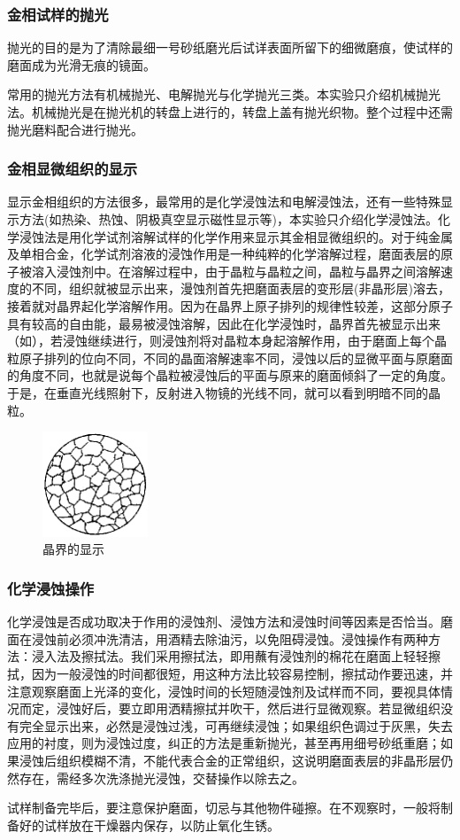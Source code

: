 \documentclass[a4paper,utf8]{article}
\begin{document}
        \subsubsection{金相试样的抛光}
        抛光的目的是为了清除最细一号砂纸磨光后试详表面所留下的细微磨痕，使试样的磨面成为光滑无痕的镜面。\par
        常用的抛光方法有机械抛光、电解抛光与化学抛光三类。本实验只介绍机械抛光法。机械抛光是在抛光机的转盘上进行的，转盘上盖有抛光织物。整个过程中还需抛光磨料配合进行抛光。
        \subsubsection{金相显微组织的显示}
        显示金相组织的方法很多，最常用的是化学浸蚀法和电解浸蚀法，还有一些特殊显示方法(如热染、热蚀、阴极真空显示磁性显示等)，本实验只介绍化学浸蚀法。化学浸蚀法是用化学试剂溶解试样的化学作用来显示其金相显微组织的。对于纯金属及单相合金，化学试剂溶液的浸蚀作用是一种纯粹的化学溶解过程，磨面表层的原子被溶入浸蚀剂中。在溶解过程中，由于晶粒与晶粒之间，晶粒与晶界之间溶解速度的不同，组织就被显示出来，漫蚀剂首先把磨面表层的变形层(非晶形层)溶去，接着就对晶界起化学溶解作用。因为在晶界上原子排列的规律性较差，这部分原子具有较高的自由能，最易被浸蚀溶解，因此在化学浸蚀时，晶界首先被显示出来（如），若浸蚀继续进行，则浸蚀剂将对晶粒本身起溶解作用，由于磨面上每个晶粒原子排列的位向不同，不同的晶面溶解速率不同，浸蚀以后的显微平面与原磨面的角度不同，也就是说每个晶粒被浸蚀后的平面与原来的磨面倾斜了一定的角度。于是，在垂直光线照射下，反射进入物镜的光线不同，就可以看到明暗不同的晶粒。
        \begin{figure}[!ht]
            \caption{晶界的显示\label{fig:jingjie}}
            \includegraphics[width=0.28\textwidth]{jingjie.png}
        \end{figure}
        \subsubsection{化学浸蚀操作}
        化学浸蚀是否成功取决于作用的浸蚀剂、浸蚀方法和浸蚀时间等因素是否恰当。磨面在浸蚀前必须冲洗清洁，用酒精去除油污，以免阻碍浸蚀。浸蚀操作有两种方法：浸入法及擦拭法。我们采用擦拭法，即用蘸有浸蚀剂的棉花在磨面上轻轻擦拭，因为一般浸蚀的时间都很短，用这种方法比较容易控制，擦拭动作要迅速，并注意观察磨面上光泽的变化，浸蚀时间的长短随浸蚀剂及试样而不同，要视具体情况而定，浸蚀好后，要立即用洒精擦拭并吹干，然后进行显微观察。若显微组织没有完全显示出来，必然是浸蚀过浅，可再继续浸蚀；如果组织色调过于灰黑，失去应用的衬度，则为浸蚀过度，纠正的方法是重新抛光，甚至再用细号砂纸重磨；如果浸蚀后组织模糊不清，不能代表合金的正常组织，这说明磨面表层的非晶形层仍然存在，需经多次洗涤抛光浸蚀，交替操作以除去之。\par
        试样制备完毕后，要注意保护磨面，切忌与其他物件碰擦。在不观察时，一般将制备好的试样放在干燥器内保存，以防止氧化生锈。
\end{document}
